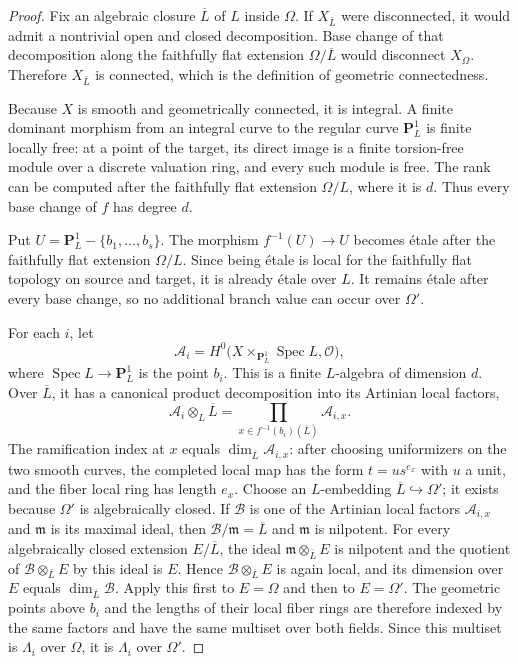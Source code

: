 \documentclass[10pt,a4paper]{amsart}
\numberwithin{equation}{section}
\begin{document}
\begin{proof}
Fix an algebraic closure $\overline L$ of $L$ inside $\Omega$.  If
$X_{\overline L}$ were disconnected, it would admit a nontrivial open and
closed decomposition.  Base change of that decomposition along the
faithfully flat extension $\Omega/\overline L$ would disconnect
$X_\Omega$.  Therefore $X_{\overline L}$ is connected, which is the
definition of geometric connectedness.

Because $X$ is smooth and geometrically connected, it is integral.  A
finite dominant morphism from an integral curve to the regular curve
$\mathbf P^1_L$ is finite locally free: at a point of the target, its
direct image is a finite torsion-free module over a discrete valuation
ring, and every such module is free.  The rank can be computed after the
faithfully flat extension $\Omega/L$, where it is $d$.  Thus every base
change of $f$ has degree $d$.

Put $U=\mathbf P^1_L-\{b_1,\ldots,b_s\}$.  The morphism
$f^{-1}(U)\to U$ becomes \'etale after the faithfully flat extension
$\Omega/L$.  Since being \'etale is local for the faithfully flat topology
on source and target, it is already \'etale over $L$.  It remains \'etale
after every base change, so no additional branch value can occur over
$\Omega'$.

For each $i$, let
\[
 \mathcal A_i=H^0\bigl(X\times_{\mathbf P^1_L}\operatorname{Spec}L,
              \mathcal O\bigr),
\]
where $\operatorname{Spec}L\to\mathbf P^1_L$ is the point $b_i$.  This is
a finite $L$-algebra of dimension $d$.  Over $\overline L$, it has a
canonical product decomposition into its Artinian local factors,
\[
 \mathcal A_i\otimes_L\overline L
 =\prod_{x\in f^{-1}(b_i)(\overline L)}\mathcal A_{i,x}.
\]
The ramification index at $x$ equals
$\dim_{\overline L}\mathcal A_{i,x}$: after choosing uniformizers on the two smooth
curves, the completed local map has the form
$t=u s^{e_x}$ with $u$ a unit, and the fiber local ring has length $e_x$.
Choose an $L$-embedding $\overline L\hookrightarrow\Omega'$; it exists
because $\Omega'$ is algebraically closed.  If $\mathcal B$ is one of the
Artinian local factors $\mathcal A_{i,x}$ and $\mathfrak m$ is its maximal
ideal, then $\mathcal B/\mathfrak m=\overline L$ and $\mathfrak m$ is
nilpotent.  For every algebraically closed extension $E/\overline L$, the
ideal $\mathfrak m\otimes_{\overline L}E$ is nilpotent and the quotient of
$\mathcal B\otimes_{\overline L}E$ by this ideal is $E$.  Hence
$\mathcal B\otimes_{\overline L}E$ is again local, and its dimension over
$E$ equals $\dim_{\overline L}\mathcal B$.  Apply this first to
$E=\Omega$ and then to $E=\Omega'$.  The geometric points above $b_i$ and
the lengths of their local fiber rings are therefore indexed by the same
factors and have the same multiset over both fields.  Since this multiset is
$\Lambda_i$ over $\Omega$, it is $\Lambda_i$ over $\Omega'$.
\end{proof}
\end{document}
